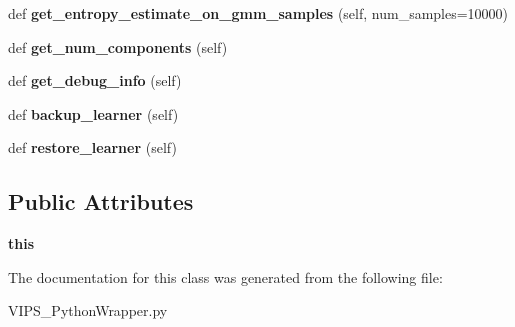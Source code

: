 \begin{DoxyCompactItemize}
\item 
def {\bfseries get\+\_\+entropy\+\_\+estimate\+\_\+on\+\_\+gmm\+\_\+samples} (self, num\+\_\+samples=10000)\hypertarget{classVIPS__PythonWrapper_1_1VIPS__PythonWrapper_ad7d1978419a0e99bf79a051dc174e968}{}\label{classVIPS__PythonWrapper_1_1VIPS__PythonWrapper_ad7d1978419a0e99bf79a051dc174e968}

\item 
def {\bfseries get\+\_\+num\+\_\+components} (self)\hypertarget{classVIPS__PythonWrapper_1_1VIPS__PythonWrapper_af7d7d4b29e32db8750097d7c7d70ae3a}{}\label{classVIPS__PythonWrapper_1_1VIPS__PythonWrapper_af7d7d4b29e32db8750097d7c7d70ae3a}

\item 
def {\bfseries get\+\_\+debug\+\_\+info} (self)\hypertarget{classVIPS__PythonWrapper_1_1VIPS__PythonWrapper_ae8b85814af86a48fc056835adcf7e1b7}{}\label{classVIPS__PythonWrapper_1_1VIPS__PythonWrapper_ae8b85814af86a48fc056835adcf7e1b7}

\item 
def {\bfseries backup\+\_\+learner} (self)\hypertarget{classVIPS__PythonWrapper_1_1VIPS__PythonWrapper_a91d685f7c3643b33d570e2e10e1df8cc}{}\label{classVIPS__PythonWrapper_1_1VIPS__PythonWrapper_a91d685f7c3643b33d570e2e10e1df8cc}

\item 
def {\bfseries restore\+\_\+learner} (self)\hypertarget{classVIPS__PythonWrapper_1_1VIPS__PythonWrapper_ab443f0f71c3cda42e5fd2c35b618b47a}{}\label{classVIPS__PythonWrapper_1_1VIPS__PythonWrapper_ab443f0f71c3cda42e5fd2c35b618b47a}

\end{DoxyCompactItemize}
\subsection*{Public Attributes}
\begin{DoxyCompactItemize}
\item 
{\bfseries this}\hypertarget{classVIPS__PythonWrapper_1_1VIPS__PythonWrapper_adb6e9e15a74ffe66a7b6442cead1bf25}{}\label{classVIPS__PythonWrapper_1_1VIPS__PythonWrapper_adb6e9e15a74ffe66a7b6442cead1bf25}

\end{DoxyCompactItemize}


The documentation for this class was generated from the following file\+:\begin{DoxyCompactItemize}
\item 
V\+I\+P\+S\+\_\+\+Python\+Wrapper.\+py\end{DoxyCompactItemize}
